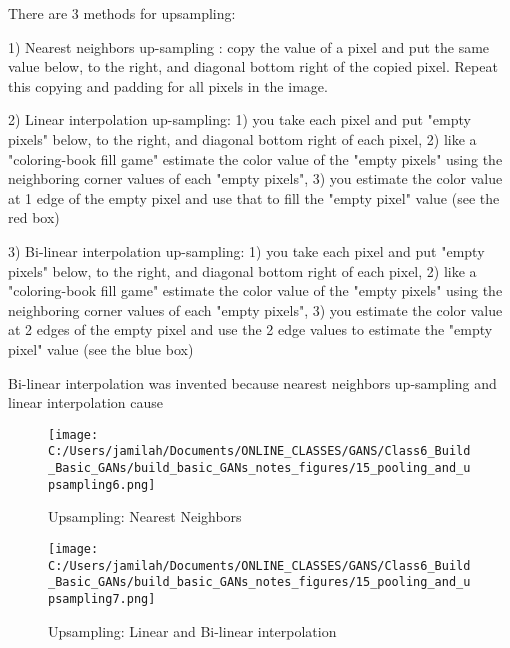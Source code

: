 \documentclass[11pt, onecolumn]{article}
\begin{document}
There are 3 methods for upsampling: 

1) Nearest neighbors up-sampling : copy the value of a pixel and put the same value below, to the right, and diagonal bottom right of the copied pixel.  Repeat this copying and padding for all pixels in the image.

2) Linear interpolation up-sampling: 1) you take each pixel and put "empty pixels" below, to the right, and diagonal bottom right of each pixel, 2) like a "coloring-book fill game" estimate the color value of the "empty pixels" using the neighboring corner values of each "empty pixels", 3) you estimate the color value at 1 edge of the empty pixel and use that to fill the "empty pixel" value (see the red box)

3) Bi-linear interpolation up-sampling: 1) you take each pixel and put "empty pixels" below, to the right, and diagonal bottom right of each pixel, 2) like a "coloring-book fill game" estimate the color value of the "empty pixels" using the neighboring corner values of each "empty pixels", 3) you estimate the color value at 2 edges of the empty pixel and use the 2 edge values to estimate the "empty pixel" value (see the blue box)

Bi-linear interpolation was invented because nearest neighbors up-sampling and linear interpolation cause

\begin{figure}[htp]
\begin{center}
\texttt{[image: C:/Users/jamilah/Documents/ONLINE\_CLASSES/GANS/Class6\_Build\_Basic\_GANs/build\_basic\_GANs\_notes\_figures/15\_pooling\_and\_upsampling6.png]}
\end{center}
\caption{Upsampling: Nearest Neighbors}
\label{15_pooling_and_upsampling6}
\end{figure}

\begin{figure}[htp]
\begin{center}
\texttt{[image: C:/Users/jamilah/Documents/ONLINE\_CLASSES/GANS/Class6\_Build\_Basic\_GANs/build\_basic\_GANs\_notes\_figures/15\_pooling\_and\_upsampling7.png]}
\end{center}
\caption{Upsampling: Linear and Bi-linear interpolation}
\label{15_pooling_and_upsampling7}
\end{figure}
\end{document}
